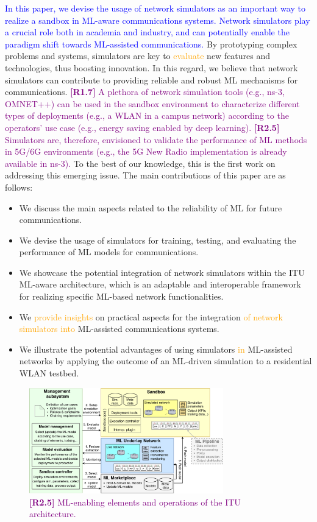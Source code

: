 \documentclass[journal]{IEEEtran}
\begin{document}
	\textcolor{blue}{In this paper, we devise the usage of network simulators as an important way to realize a sandbox in ML-aware communications systems. Network simulators play a crucial role both in academia and industry, and can potentially enable the paradigm shift towards ML-assisted communications.} By prototyping complex problems and systems, simulators are key to \textcolor{orange}{evaluate} new features and technologies, thus boosting innovation. In this regard, we believe that network simulators can contribute to providing reliable and robust ML mechanisms for communications. \textcolor{purple}{\textbf{[R1.7]} A plethora of network simulation tools (e.g., ns-3, OMNET++) can be used in the sandbox environment to characterize different types of deployments (e.g., a WLAN in a campus network) according to the operators' use case (e.g., energy saving enabled by deep learning).} \textcolor{purple}{\textbf{[R2.5]} Simulators are, therefore, envisioned to validate the performance of ML methods in 5G/6G environments (e.g., the 5G New Radio implementation is already available in ns-3).} To the best of our knowledge, this is the first work on addressing this emerging issue. The main contributions of this paper are as follows:
	\begin{itemize}
		\item We discuss the main aspects related to the reliability of ML for future communications.
		\item We devise the usage of simulators for training, testing, and evaluating the performance of ML models for communications.
		\item We showcase the potential integration of network simulators within the ITU ML-aware architecture, which is an adaptable and interoperable framework for realizing specific ML-based network functionalities.
		\item We \textcolor{orange}{provide insights} on practical aspects for the integration \textcolor{orange}{of network simulators into} ML-assisted communications systems. 
		\item We illustrate the potential advantages of using simulators \textcolor{orange}{in} ML-assisted networks by applying the outcome of an ML-driven simulation to a residential WLAN testbed.
	\end{itemize}

	\begin{figure}[ht!]
		\centering
		\includegraphics[width=0.75\textwidth]{architecture_example.pdf}
		\caption{\textcolor{purple}{\textbf{[R2.5]} 
		ML-enabling elements and operations of the ITU architecture.}}
		\label{fig:example_simulator}
	\end{figure}
		
\end{document}
